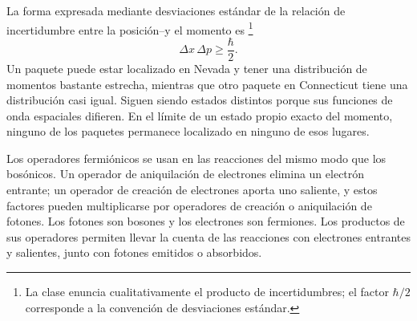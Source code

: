 \begin{classroomqa}\end{classroomqa}

La forma expresada mediante desviaciones estándar de la relación de incertidumbre entre la posición--y el momento es
\footnote{La clase enuncia cualitativamente el producto de incertidumbres; el factor \(\hbar/2\) corresponde a la convención de desviaciones estándar.}\begin{equation}
\Delta x\,\Delta p\geq\frac{\hbar}{2}.
\end{equation}
Un paquete puede estar localizado en Nevada y tener una distribución de momentos bastante estrecha, mientras que otro paquete en Connecticut tiene una distribución casi igual. Siguen siendo estados distintos porque sus funciones de onda espaciales difieren. En el límite de un estado propio exacto del momento, ninguno de los paquetes permanece localizado en ninguno de esos lugares.

Los operadores fermiónicos se usan en las reacciones del mismo modo que los bosónicos. Un operador de aniquilación de electrones elimina un electrón entrante; un operador de creación de electrones aporta uno saliente, y estos factores pueden multiplicarse por operadores de creación o aniquilación de fotones. Los fotones son bosones y los electrones son fermiones. Los productos de sus operadores permiten llevar la cuenta de las reacciones con electrones entrantes y salientes, junto con fotones emitidos o absorbidos.

\begin{classroomqa}\end{classroomqa}

